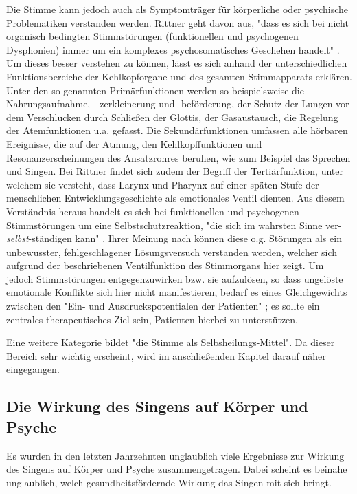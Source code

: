 Die Stimme kann jedoch auch als Symptomträger für körperliche oder psychische Problematiken verstanden werden. Rittner geht davon aus, "dass es sich bei nicht organisch bedingten Stimmstörungen (funktionellen und psychogenen Dysphonien) immer um ein komplexes psychosomatisches Geschehen handelt" \autocite[212f.]{rittner2008}. Um dieses besser verstehen zu können, lässt es sich anhand der unterschiedlichen Funktionsbereiche der Kehlkopforgane und des gesamten Stimmapparats erklären. Unter den so genannten Primärfunktionen werden so beispielsweise die Nahrungsaufnahme, - zerkleinerung und -beförderung, der Schutz der Lungen vor dem Verschlucken durch Schließen der Glottis, der Gasaustausch, die Regelung der Atemfunktionen u.a. gefasst. Die Sekundärfunktionen umfassen alle hörbaren Ereignisse, die auf der Atmung, den Kehlkopffunktionen und Resonanzerscheinungen des Ansatzrohres beruhen, wie zum Beispiel das Sprechen und Singen. Bei Rittner findet sich zudem der Begriff der Tertiärfunktion, unter welchem sie versteht, dass Larynx und Pharynx auf einer späten Stufe der menschlichen Entwicklungsgeschichte als emotionales Ventil dienten. Aus diesem Verständnis heraus handelt es sich bei funktionellen und psychogenen Stimmstörungen um eine Selbstschutzreaktion, "die sich im wahrsten Sinne ver-\emph{selbst}-ständigen kann" \autocite[213]{rittner2008}. Ihrer Meinung nach können diese o.g. Störungen als ein unbewusster, fehlgeschlagener Lösungsversuch verstanden werden, welcher sich aufgrund der beschriebenen Ventilfunktion des Stimmorgans hier zeigt. Um jedoch Stimmstörungen entgegenzuwirken bzw. sie aufzulösen, so dass ungelöste emotionale Konflikte sich hier nicht manifestieren, bedarf es eines Gleichgewichts zwischen den "Ein- und Ausdruckspotentialen der Patienten" \autocite[64]{rittner2012}; es sollte ein zentrales therapeutisches Ziel sein, Patienten hierbei zu unterstützen. 

Eine weitere Kategorie bildet "die Stimme als Selbsheilungs-Mittel". Da dieser Bereich sehr wichtig erscheint, wird im anschließenden Kapitel darauf näher eingegangen.

\subsection{Die Wirkung des Singens auf Körper und Psyche} 
Es wurden in den letzten Jahrzehnten unglaublich viele Ergebnisse zur Wirkung des Singens auf Körper und Psyche zusammengetragen. Dabei scheint es beinahe unglaublich, welch gesundheitsfördernde Wirkung das Singen mit sich bringt.

